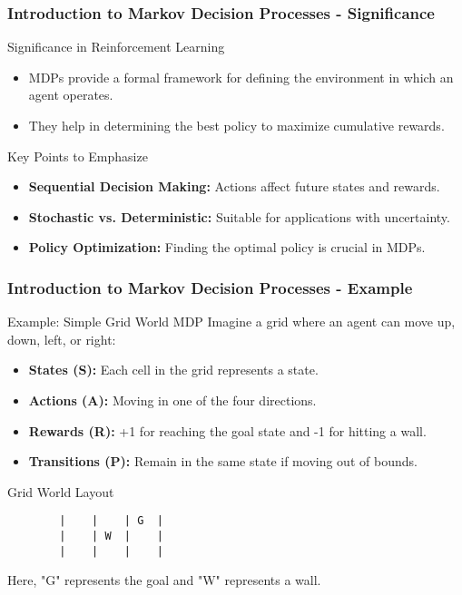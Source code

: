 \documentclass[aspectratio=169]{beamer}
\begin{document}
\begin{frame}[fragile]
    \frametitle{Introduction to Markov Decision Processes - Significance}
    \begin{block}{Significance in Reinforcement Learning}
        \begin{itemize}
            \item MDPs provide a formal framework for defining the environment in which an agent operates.
            \item They help in determining the best policy to maximize cumulative rewards.
        \end{itemize}
    \end{block}
    
    \begin{block}{Key Points to Emphasize}
        \begin{itemize}
            \item \textbf{Sequential Decision Making:} Actions affect future states and rewards.
            \item \textbf{Stochastic vs. Deterministic:} Suitable for applications with uncertainty.
            \item \textbf{Policy Optimization:} Finding the optimal policy is crucial in MDPs.
        \end{itemize}
    \end{block}
\end{frame}

\begin{frame}[fragile]
    \frametitle{Introduction to Markov Decision Processes - Example}
    \begin{block}{Example: Simple Grid World MDP}
        Imagine a grid where an agent can move up, down, left, or right:
        \begin{itemize}
            \item \textbf{States (S):} Each cell in the grid represents a state.
            \item \textbf{Actions (A):} Moving in one of the four directions.
            \item \textbf{Rewards (R):} +1 for reaching the goal state and -1 for hitting a wall. 
            \item \textbf{Transitions (P):} Remain in the same state if moving out of bounds.
        \end{itemize}
    \end{block}
    \begin{block}{Grid World Layout}
        \begin{verbatim}
        |    |    | G  |
        |    | W  |    |
        |    |    |    |
        \end{verbatim}
        Here, "G" represents the goal and "W" represents a wall.
    \end{block}
\end{frame}
\end{document}
